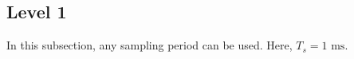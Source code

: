 \subsection*{Level 1}

In this subsection, any sampling period can be used. Here, $T_s = 1 \text{ ms}$.





